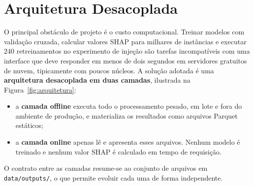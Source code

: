 \section{Arquitetura Desacoplada}
\label{sec:arq_visao}

O principal obstáculo de projeto é o custo computacional. Treinar modelos com validação cruzada, calcular valores SHAP para milhares de instâncias e executar 240 retreinamentos no experimento de injeção são tarefas incompatíveis com uma interface que deve responder em menos de dois segundos em servidores gratuitos de nuvem, tipicamente com poucos núcleos. A solução adotada é uma \textbf{arquitetura desacoplada em duas camadas}, ilustrada na Figura~\ref{fig:arquitetura}:
\begin{itemize}
    \item a \textbf{camada offline} executa todo o processamento pesado, em lote e fora do ambiente de produção, e materializa os resultados como arquivos Parquet estáticos;
    \item a \textbf{camada online} apenas lê e apresenta esses arquivos. Nenhum modelo é treinado e nenhum valor SHAP é calculado em tempo de requisição.
\end{itemize}
O contrato entre as camadas resume-se ao conjunto de arquivos em \texttt{data/outputs/}, o que permite evoluir cada uma de forma independente.

